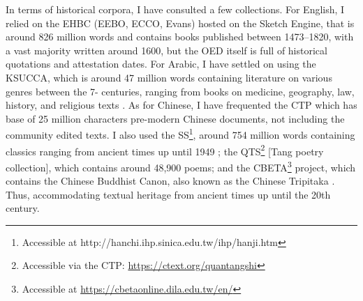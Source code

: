 In terms of historical corpora, I have consulted a few collections. For English, I relied on the \gls{EHBC} (EEBO, ECCO, Evans) hosted on the Sketch Engine, that is around 826 million words and contains books published between 1473--1820, with a vast majority written around 1600, but the \gls{OED} itself is full of historical quotations and attestation dates.
For Arabic, I have settled on using the \gls{KSUCCA}, which is around 47 million words containing literature on various genres between the 7- centuries, ranging from books on medicine, geography, law, history, and religious texts \autocite{alrabiah_design_2013,alrabiah_empirical_2014}. As for Chinese, I have frequented the \gls{CTP} \autocite{sturgeon_chinese_nodate,sturgeon_chinese_2021} which has base of 25 million characters pre-modern Chinese documents, not including the community edited texts. I also used the \gls{SS}\footnote{Accessible at http://hanchi.ihp.sinica.edu.tw/ihp/hanji.htm}, around 754 million words containing classics ranging from ancient times up until 1949 \autocite{academia_sinica_scripta_1993}; the \gls{QTS}\footnote{Accessible via the \gls{CTP}: \url{https://ctext.org/quantangshi}} [Tang poetry collection], which contains around 48,900 poems; and the \gls{CBETA}\footnote{Accessible at \url{https://cbetaonline.dila.edu.tw/en/}} project, which contains the Chinese Buddhist Canon, also known as the Chinese Tripitaka \autocite[365-386]{chen_buddhism_1964}. Thus, accommodating textual heritage from ancient times up until the 20th century.


